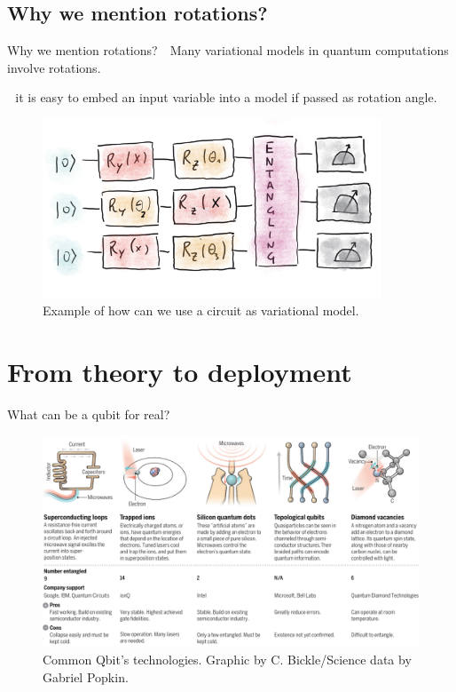 \documentclass[8pt, xcolor={svgnames}, hyperref={colorlinks,linkcolor=black, citecolor=amethyst, urlcolor=amethyst}]{beamer}
\begin{document}
\subsection{Why we mention rotations?}

\begin{frame}{Why we mention rotations?}
\large 
    \faArrowCircleRight\,\, Many variational models in quantum computations involve 
    rotations.
    
    \faArrowCircleRight\,\, it is easy to embed an input variable into a model if 
    passed as rotation angle.

    \begin{figure}
    \centering 
    \includegraphics[width=0.9\textwidth]{figures/variational_model.png}
  \caption{Example of how can we use a circuit as variational model.}
  \end{figure}
\end{frame}

\section{From theory to deployment}

\begin{frame}{What can be a qubit for real?}
    \begin{figure}
    \centering 
    \includegraphics[width=\textwidth]{figures/Quantum_tech.png}
  \caption{Common Qbit's technologies. Graphic by C. Bickle/Science data by Gabriel Popkin.}
  \end{figure}
\end{frame}
\end{document}
